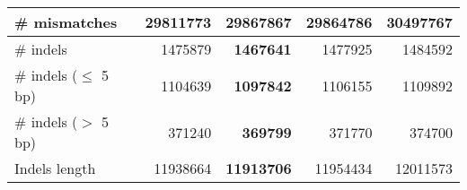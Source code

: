 \documentclass[12pt,a4paper]{article}
\begin{document}
\begin{table}[ht]
\begin{center}
\begin{tabular}{|l*{4}{|r}|}
\# mismatches & {\bf 29811773} & 29867867 & 29864786 & 30497767 \\ \hline
\# indels & 1475879 & {\bf 1467641} & 1477925 & 1484592 \\ \hline
\hspace{5mm}\# indels ($\leq$ 5 bp) & 1104639 & {\bf 1097842} & 1106155 & 1109892 \\ \hline
\hspace{5mm}\# indels ($>$ 5 bp) & 371240 & {\bf 369799} & 371770 & 374700 \\ \hline
Indels length & 11938664 & {\bf 11913706} & 11954434 & 12011573 \\ \hline
\end{tabular}
\end{center}
\end{table}
\end{document}
